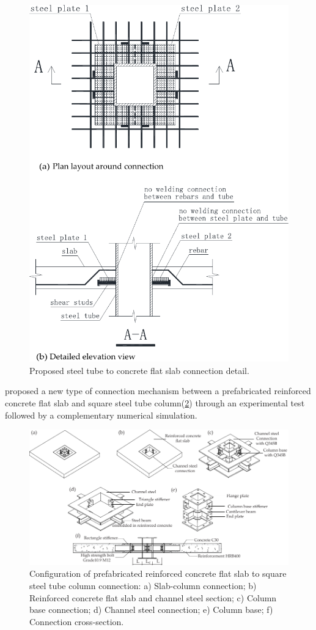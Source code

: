 \documentclass[twocolumn]{article} %
\begin{document}
\begin{figure}\centering
    \includegraphics[width=\columnwidth]{Figures/y2020f3.pdf}
    \caption{Proposed steel tube to concrete flat slab connection detail\citep{yu2020}.}
    \label{y2020f3}
    \end{figure}
\cite{zhang2018} proposed a new type of connection mechanism between a prefabricated reinforced concrete flat slab and square steel tube column(\ref{z2018f1}) through an experimental test followed by a complementary numerical simulation. 
\begin{figure}\centering
    \includegraphics[width=\textwidth]{Figures/z2018f1.pdf}
    \caption{Configuration of prefabricated reinforced concrete flat slab to square steel tube column connection\citep{zhang2018}: a) Slab-column connection; b) Reinforced concrete flat slab and channel steel section; c) Column base connection; d) Channel steel connection; e) Column base; f) Connection cross-section.}
    \label{z2018f1}
    \end{figure}
\end{document}
